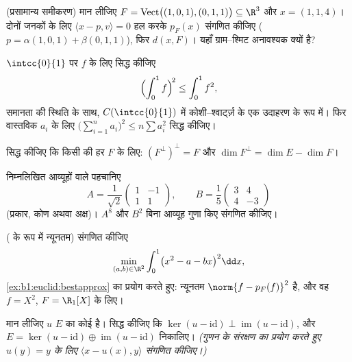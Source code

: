 \begin{exercise}[$\star\star$]\label{exo:b1:euclid:5}
(प्रसामान्य समीकरण) मान लीजिए $F =
\operatorname{Vect}\bigl((1,0,1),(0,1,1)\bigr) \subseteq \R^3$ और $x = (1,
1, 4)$। दोनों जनकों के लिए $\langle x - p, v \rangle = 0$ हल करके $p_F(x)$
संगणित कीजिए ($p = \alpha(1,0,1) + \beta(0,1,1)$), फिर $d(x, F)$। यहाँ
ग्राम--श्मिट अनावश्यक क्यों है?
\end{exercise}

\begin{exercise}[$\star\star$]\label{exo:b1:euclid:6}
$\intcc{0}{1}$ पर  $f$ के लिए सिद्ध कीजिए
\[
\Bigl(\int_0^1 f\Bigr)^{\!2} \leq \int_0^1 f^2 ,
\]
समानता की स्थिति के साथ, $C(\intcc{0}{1})$ में कोशी--श्वार्ट्ज़ के एक उदाहरण
के रूप में। फिर वास्तविक $a_i$ के लिए $\bigl(\sum_{i=1}^n a_i\bigr)^2 \leq n
\sum a_i^2$ सिद्ध कीजिए।
\end{exercise}

\begin{exercise}[$\star\star$]\label{exo:b1:euclid:7}
सिद्ध कीजिए कि किसी  की हर  $F$ के लिए:
$(F^{\perp})^{\perp} = F$ और $\dim F^{\perp} = \dim E - \dim F$।
\end{exercise}

\begin{exercise}[$\star\star$]\label{exo:b1:euclid:8}
निम्नलिखित आव्यूहों वाले  पहचानिए
\[
A = \frac{1}{\sqrt 2}\begin{pmatrix} 1 & -1\\ 1 & 1\end{pmatrix},
\qquad
B = \frac{1}{5}\begin{pmatrix} 3 & 4\\ 4 & -3\end{pmatrix}
\]
(प्रकार, कोण अथवा अक्ष)। $A^8$ और $B^2$ बिना आव्यूह गुणा किए संगणित कीजिए।
\end{exercise}

\begin{exercise}[$\star\star\star$]\label{exo:b1:euclid:9}
( के रूप में न्यूनतम) संगणित कीजिए
\[
\min_{(a, b) \in \R^2} \int_0^1 \bigl(x^2 - a - bx\bigr)^2 \dd x ,
\]
\cref{ex:b1:euclid:bestapprox} का प्रयोग करते हुए: न्यूनतम $\norm{f -
p_F(f)}^2$ है, और वह $f = X^2$, $F = \R_1[X]$ के लिए।
\end{exercise}

\begin{exercise}[$\star\star\star$]\label{exo:b1:euclid:10}
मान लीजिए $u$  $E$ का कोई  है। सिद्ध कीजिए कि $\ker(u
- \mathrm{id}) \perp \operatorname{im}(u - \mathrm{id})$, और $E = \ker(u -
\mathrm{id}) \oplus \operatorname{im}(u - \mathrm{id})$ निकालिए। \emph{(गुणन
के संरक्षण का प्रयोग करते हुए $u(y) = y$ के लिए $\langle x - u(x), y\rangle$
संगणित कीजिए।)}
\end{exercise}

